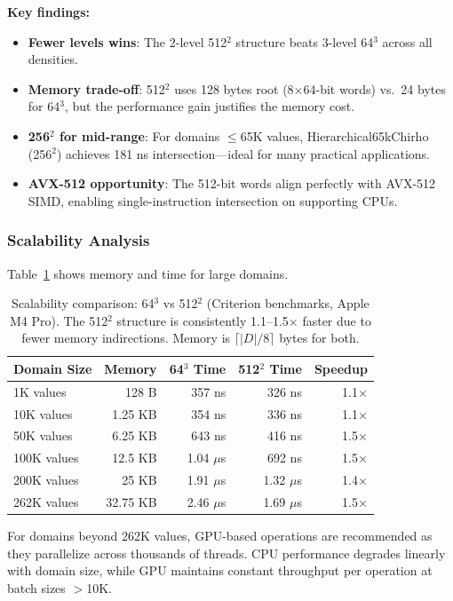 \documentclass[11pt,a4paper]{article}
\begin{document}
\textbf{Key findings:}
\begin{itemize}
  \item \textbf{Fewer levels wins}: The 2-level 512$^2$ structure beats 3-level 64$^3$ across all densities.
  \item \textbf{Memory trade-off}: 512$^2$ uses 128 bytes root (8$\times$64-bit words) vs.\ 24 bytes for 64$^3$, but the performance gain justifies the memory cost.
  \item \textbf{256$^2$ for mid-range}: For domains $\leq$65K values, Hierarchical65kChirho (256$^2$) achieves 181 ns intersection---ideal for many practical applications.
  \item \textbf{AVX-512 opportunity}: The 512-bit words align perfectly with AVX-512 SIMD, enabling single-instruction intersection on supporting CPUs.
\end{itemize}

\subsubsection{Scalability Analysis}

Table~\ref{tab:scalability} shows memory and time for large domains.

\begin{table}[H]
\centering
\begin{tabular}{lrrrr}
\toprule
\textbf{Domain Size} & \textbf{Memory} & \textbf{64$^3$ Time} & \textbf{512$^2$ Time} & \textbf{Speedup} \\
\midrule
1K values & 128 B & 357 ns & 326 ns & 1.1$\times$ \\
10K values & 1.25 KB & 354 ns & 336 ns & 1.1$\times$ \\
50K values & 6.25 KB & 643 ns & 416 ns & 1.5$\times$ \\
100K values & 12.5 KB & 1.04 $\mu$s & 692 ns & 1.5$\times$ \\
200K values & 25 KB & 1.91 $\mu$s & 1.32 $\mu$s & 1.4$\times$ \\
262K values & 32.75 KB & 2.46 $\mu$s & 1.69 $\mu$s & 1.5$\times$ \\
\bottomrule
\end{tabular}
\caption{Scalability comparison: 64$^3$ vs 512$^2$ (Criterion benchmarks, Apple M4 Pro). The 512$^2$ structure is consistently 1.1--1.5$\times$ faster due to fewer memory indirections. Memory is $\lceil|D|/8\rceil$ bytes for both.}
\label{tab:scalability}
\end{table}

For domains beyond 262K values, GPU-based operations are recommended as they parallelize across thousands of threads.
CPU performance degrades linearly with domain size, while GPU maintains constant throughput per operation at batch sizes $>$10K.
\end{document}
